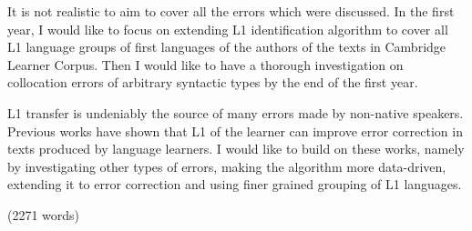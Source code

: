 \documentclass[11pt]{article}
\begin{document}
It is not realistic to aim to cover all the errors which were discussed. In the first year, I would like to focus on extending L1 identification algorithm to cover all L1 language groups of first languages of the authors of the texts in Cambridge Learner Corpus. Then I would like to have a thorough investigation on collocation errors of arbitrary syntactic types by the end of the first year.

L1 transfer is undeniably the source of many errors made by non-native speakers. Previous works have shown that L1 of the learner can improve error correction in texts produced by language learners. I would like to build on these works, namely by investigating other types of errors, making the algorithm more data-driven, extending it to error correction and using finer grained grouping of L1 languages. 



(2271 words)





\end{document}
